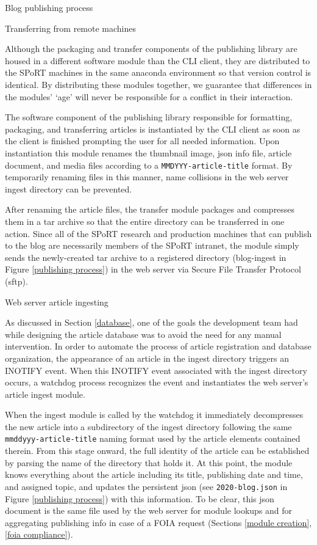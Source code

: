 Blog publishing process

Transferring from remote machines

Although the packaging and transfer components of the publishing library are housed in a different software module than the CLI client, they are distributed to the SPoRT machines in the same anaconda environment so that version control is identical. By distributing these modules together, we guarantee that differences in the modules' `age' will never be responsible for a conflict in their interaction.

The software component of the publishing library responsible for formatting, packaging, and transferring articles is instantiated by the CLI client as soon as the client is finished prompting the user for all needed information. Upon instantiation this module renames the thumbnail image, json info file, article document, and media files according to a \texttt{MMDYYY-article-title} format. By temporarily renaming files in this manner, name collisions in the web server ingest directory can be prevented.

After renaming the article files, the transfer module packages and compresses them in a tar archive so that the entire directory can be transferred in one action. Since all of the SPoRT research and production machines that can publish to the blog are necessarily members of the SPoRT intranet, the module simply sends the newly-created tar archive to a registered directory (blog-ingest in Figure \ref{publishing process}) in the web server via Secure File Transfer Protocol (sftp).

Web server article ingesting

As discussed in Section \ref{database}, one of the goals the development team had while designing the article database was to avoid the need for any manual intervention. In order to automate the process of article registration and database organization, the appearance of an article in the ingest directory triggers an INOTIFY event. When this INOTIFY event associated with the ingest directory occurs, a watchdog process recognizes the event and instantiates the web server's article ingest module.

When the ingest module is called by the watchdog it immediately decompresses the new article into a subdirectory of the ingest directory following the same \texttt{mmddyyy-article-title} naming format used by the article elements contained therein. From this stage onward, the full identity of the article can be established by parsing the name of the directory that holds it. At this point, the module knows everything about the article including its title, publishing date and time, and assigned topic, and updates the persistent json (see \texttt{2020-blog.json} in Figure \ref{publishing process}) with this information. To be clear, this json document is the same file used by the web server for module lookups and for aggregating publishing info in case of a FOIA request (Sections \ref{module creation}, \ref{foia compliance}).


